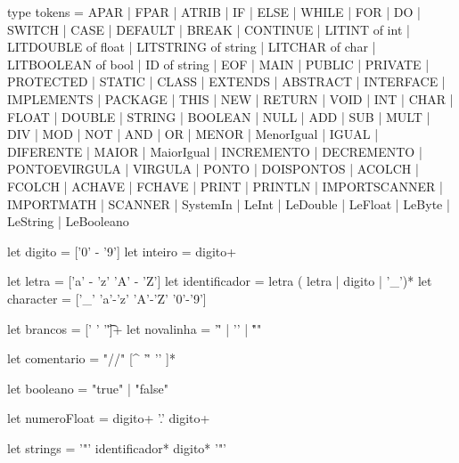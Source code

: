 \documentclass[12pt,a4paper,twoside]{report}
\begin{document}
\begin{terminal}
{type tokens = APAR
            | FPAR
            | ATRIB
            | IF
            | ELSE
            | WHILE
            | FOR
            | DO
            | SWITCH
            | CASE
            | DEFAULT
            | BREAK
            | CONTINUE
            | LITINT of int
            | LITDOUBLE of float
            | LITSTRING of string
            | LITCHAR of char
            | LITBOOLEAN of bool
            | ID of string
            | EOF
            | MAIN
            | PUBLIC
            | PRIVATE
            | PROTECTED
            | STATIC
            | CLASS
            | EXTENDS
            | ABSTRACT  
            | INTERFACE
            | IMPLEMENTS  
            | PACKAGE  
            | THIS
            | NEW
            | RETURN
            | VOID
            | INT
            | CHAR
            | FLOAT
            | DOUBLE
            | STRING
            | BOOLEAN
            | NULL
            | ADD
            | SUB
            | MULT
            | DIV
            | MOD
            | NOT
            | AND
            | OR
            | MENOR
            | MenorIgual
            | IGUAL
            | DIFERENTE
            | MAIOR
            | MaiorIgual
            | INCREMENTO
            | DECREMENTO
            | PONTOEVIRGULA
            | VIRGULA
            | PONTO
            | DOISPONTOS
            | ACOLCH
            | FCOLCH
            | ACHAVE
            | FCHAVE
            | PRINT
            | PRINTLN
            | IMPORTSCANNER
            | IMPORTMATH
            | SCANNER
            | SystemIn
            | LeInt
            | LeDouble
            | LeFloat
            | LeByte
            | LeString
            | LeBooleano

}


let digito = ['0' - '9']
let inteiro = digito+

let letra = ['a' - 'z' 'A' - 'Z']
let identificador = letra ( letra | digito | '_')*
let character = ['_' 'a'-'z' 'A'-'Z' '0'-'9']

let brancos = [' ' '\t']+
let novalinha = '\r' | '\n' | "\r\n"

let comentario = "//" [^ '\r' '\n' ]*

let booleano = "true" | "false"

let numeroFloat = digito+ '.' digito+

let strings = '"' identificador* digito* '"'



\end{terminal}
\end{document}
